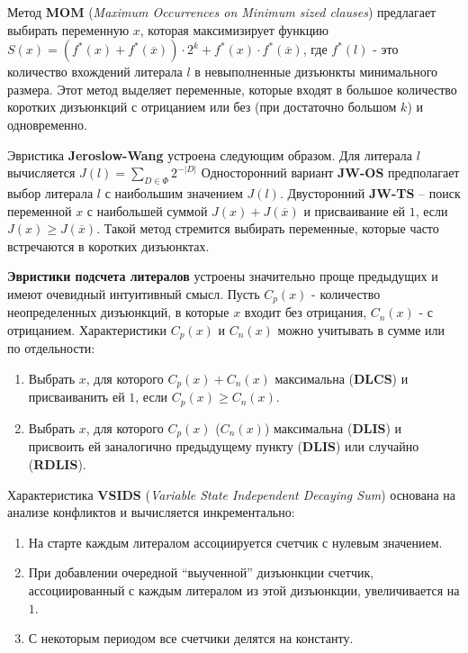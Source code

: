 Метод \textbf{MOM} (\textit{Maximum Occurrences on Minimum sized clauses}) предлагает выбирать переменную $x$, которая максимизирует функцию 
$S(x) = \left(f^{*}(x) + f^{*}(\overline{x})\right) \cdot 2^{k} + f^{*}(x) \cdot f^{*}(\overline{x})$, где $f^{*}(l)$ - это количество вхождений литерала $l$ в невыполненные дизъюнкты минимального размера. Этот метод выделяет переменные, которые входят в большое количество коротких дизъюнкций с отрицанием или без (при достаточно большом $k$) и одновременно.

Эвристика \textbf{Jeroslow-Wang} устроена следующим образом. Для литерала $l$ вычисляется $J(l) = \sum_{D \in \Phi} 2^{-\left|D\right|}$
Односторонний вариант \textbf{JW-OS} предполагает выбор литерала $l$ с наибольшим значением $J(l)$. Двусторонний \textbf{JW-TS} – поиск переменной $x$ с наибольшей суммой $J(x)+J(\overline{x})$ и присваивание ей $1$, если $J(x) \ge J(\overline{x})$. Такой метод стремится выбирать переменные, которые часто встречаются в коротких дизъюнктах.

\textbf{Эвристики подсчета литералов} устроены значительно проще предыдущих и имеют очевидный интуитивный смысл. Пусть $C_p(x)$ - количество неопределенных дизъюнкций, в которые $x$ входит без отрицания, $C_n(x)$ - с отрицанием. 
Характеристики $C_p(x)$ и $C_n(x)$ можно учитывать в сумме или по отдельности:

\begin{enumerate}[label=\arabic{*}.]
\item Выбрать $x$, для которого $C_p(x) + C_n(x)$ максимальна (\textbf{DLCS}) и присваиванить ей $1$, если $C_p(x) \ge C_n(x)$.
\item Выбрать $x$, для которого $C_p(x)$ ($C_n(x)$) максимальна (\textbf{DLIS}) и присвоить ей заналогично предыдущему пункту (\textbf{DLIS}) или случайно (\textbf{RDLIS}).
\end{enumerate}

Характеристика \textbf{VSIDS} (\textit{Variable State Independent Decaying Sum}) основана на анализе конфликтов и вычисляется инкрементально:

\begin{enumerate}[label=\arabic{*}.]
\item На старте каждым литералом ассоциируется счетчик с нулевым значением.
\item При добавлении очередной \enquote{выученной} дизъюнкции счетчик, ассоциированный с каждым литералом из этой дизъюнкции, увеличивается на $1$.
\item С некоторым периодом все счетчики делятся на константу.
\end{enumerate}

